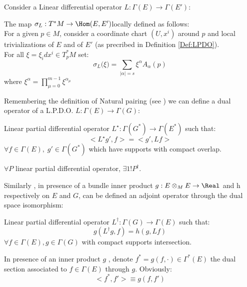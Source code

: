 \documentclass[a4paper,12pt]{scrartcl}    %
\begin{document}
		Consider a Linear differential operator $L: \Gamma(E) \rightarrow \Gamma(E')$:
		\begin{definition}
		 	The map $\sigma_L: T^*M \rightarrow \Hom(E,E') $locally defined as follows: \\
		 	For a given $p\in M$, consider a coordinate chart $(U, x^i)$ around $p$ and local trivializations of $E$ and of $E'$ (as precribed in Definition \ref{Def:LPDO}).
		 	\\ 
		 	For all $\xi = \xi_i dx^i \in T^*_pM$ set:
		 	\begin{displaymath}
		 		\sigma_L \big(\xi \big) = \sum_{|\alpha|=s}  \xi^\alpha A_\alpha (p) 
		 	\end{displaymath}
		 	where $ \xi^\alpha = \prod_{\mu=0}^{m-1} \xi^{\alpha_\mu}$
		 \end{definition}
		
		Remembering the definition of Natural pairing (see \cite{TonyBundles}) we can define a dual operator of a L.P.D.O. $L: \Gamma(E) \rightarrow \Gamma(G)$:
		\begin{definition}
			Linear partial differential operator $L^\star: \Gamma(G^*) \rightarrow \Gamma(E^*)$ such that:
			\begin{displaymath}
				<L^\star g' , f > = <g', L f> 
			\end{displaymath}
			$\forall f\in \Gamma(E),\; g' \in \Gamma(G^*)$ which have supports with compact overlap.
		\end{definition}
		\begin{proposition}
			$\forall P $ linear partial differential operator, $\exists1! P^\dagger$.
		\end{proposition}
		
		Similarly , in presence of a bundle inner product $g: E\otimes_M E \rightarrow \Real$ and h respectively on $E$ and $G$, can be defined an adjoint operator through the dual space isomorphism:
		\begin{definition}
			Linear partial differential operator $L^\dagger : \Gamma(G) \rightarrow \Gamma(E)$ such that:
			\begin{displaymath}
				g(L^\dagger g ,f)  = h(g , L f)
			\end{displaymath}
			$\forall f\in \Gamma(E), g \in \Gamma(G)$ with compact supports intersection.		
		\end{definition}		
		
		\begin{notationfix}
			In presence of an inner product $g$ , denote $f^*=g(f, \cdot)	\in \Gamma^*(E)$ the dual section associated to $f \in \Gamma(E)$ through $g$.
			Obviously:
			\begin{displaymath}
				<f^*, f'> \equiv g(f,f')
			\end{displaymath}
		\end{notationfix}
		
\end{document}
